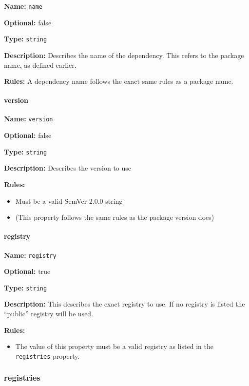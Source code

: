 \textbf{Name:} \texttt{name}

\textbf{Optional:} false

\textbf{Type:} \texttt{string}

\textbf{Description:} Describes the name of the dependency. This refers
to the package name, as defined earlier.

\textbf{Rules:} A dependency name follows the exact same rules as a
package name.

\hypertarget{version-1}{\paragraph{version}\label{version-1}}

\textbf{Name:} \texttt{version}

\textbf{Optional:} false

\textbf{Type:} \texttt{string}

\textbf{Description:} Describes the version to use

\textbf{Rules:}

\begin{itemize}
\tightlist
\item
  Must be a valid SemVer 2.0.0 string
\item
  (This property follows the same rules as the package version does)
\end{itemize}

\hypertarget{registry}{\paragraph{registry}\label{registry}}

\textbf{Name:} \texttt{registry}

\textbf{Optional:} true

\textbf{Type:} \texttt{string}

\textbf{Description:} This describes the exact registry to use. If no
registry is listed the ``public'' registry will be used.

\textbf{Rules:}

\begin{itemize}
\tightlist
\item
  The value of this property must be a valid registry as listed in the
  \texttt{registries} property.
\end{itemize}

\hypertarget{registries}{\subsubsection{registries}\label{registries}}

